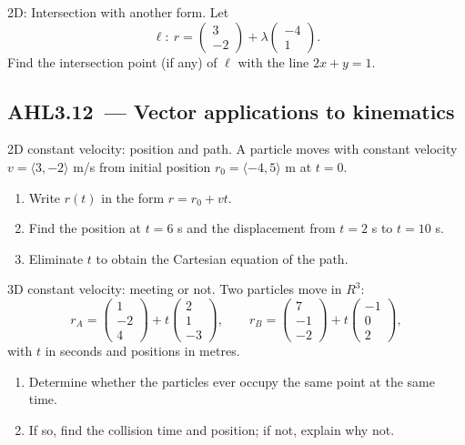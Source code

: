 \documentclass[11pt]{article}
\def\textbf#1{#1}%
\def\mathbb#1{#1}%
\def\mathbf#1{#1}%
\newcommand{\tocsubsection}[1]{\subsection{#1}}
\newcounter{question}
\begin{document}
\begin{question}
\textbf{2D: Intersection with another form.}
Let
\[
\ell:\ \mathbf{r}=\begin{pmatrix}3\\-2\end{pmatrix}+\lambda\begin{pmatrix}-4\\1\end{pmatrix}.
\]
Find the intersection point (if any) of $\ell$ with the line $2x+y=1$.
\end{question}








\tocsubsection{AHL3.12 — Vector applications to kinematics}


\begin{question}
\textbf{2D constant velocity: position and path.}
A particle moves with constant velocity \(\mathbf{v}=\langle 3,-2\rangle\) m/s from initial position \(\mathbf{r}_0=\langle -4,5\rangle\) m at \(t=0\).
\begin{enumerate}
  \item Write \(\mathbf{r}(t)\) in the form \(\mathbf{r}=\mathbf{r}_0+\mathbf{v}t\).
  \item Find the position at \(t=6\) s and the displacement from \(t=2\) s to \(t=10\) s.
  \item Eliminate \(t\) to obtain the Cartesian equation of the path.
\end{enumerate}
\end{question}

\begin{question}
\textbf{3D constant velocity: meeting or not.}
Two particles move in \(\mathbb{R}^3\):
\[
\mathbf{r}_A=\begin{pmatrix}1\\-2\\4\end{pmatrix}+t\begin{pmatrix}2\\1\\-3\end{pmatrix},\qquad
\mathbf{r}_B=\begin{pmatrix}7\\-1\\-2\end{pmatrix}+t\begin{pmatrix}-1\\0\\2\end{pmatrix},
\]
with \(t\) in seconds and positions in metres.
\begin{enumerate}
  \item Determine whether the particles ever occupy the same point at the same time.
  \item If so, find the collision time and position; if not, explain why not.
\end{enumerate}
\end{question}
\end{document}
